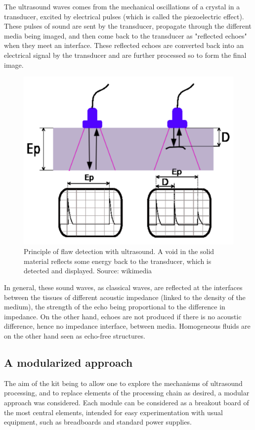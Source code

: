 \documentclass[letterpaper, 10 pt, conference]{ieeeconf} %
\begin{document}
The ultrasound waves comes from the mechanical oscillations of a crystal in a transducer, excited by electrical pulses (which is called the piezoelectric effect). These pulses of sound are sent by the transducer, propagate through the different media being imaged, and then come back to the transducer as "reflected echoes" when they meet an interface. These reflected echoes are converted back into an electrical signal by the transducer and are further processed so to form the final image.

\begin{figure}%
\centering
\includegraphics[width=.8\linewidth]{principles.pdf}
\caption{Principle of flaw detection with ultrasound. A void in the solid material reflects some energy back to the transducer, which is detected and displayed. Source: wikimedia}
\end{figure}


In general, these sound waves, as classical waves, are reflected at the interfaces between the tissues of different acoustic impedance (linked to the density of the medium), the strength of the echo being proportional to the difference in impedance. On the other hand, echoes are not produced if there is no acoustic difference, hence no impedance interface, between media. Homogeneous fluids are on the other hand seen as echo-free structures.


\subsection{A modularized approach}

The aim of the kit being to allow one to explore the mechanisms of ultrasound processing, and to replace elements of the processing chain as desired, a modular approach was considered. Each module can be considered as a breakout board of the most central elements, intended for easy experimentation with usual equipment, such as breadboards and standard power supplies.
\end{document}
